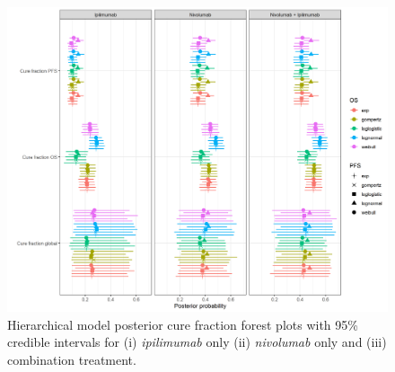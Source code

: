 \documentclass[AMA,STIX1COL]{WileyNJD-v2}
\begin{document}




\begin{figure}
\centering
\includegraphics[width=0.9\linewidth]{forest_plot_joint_cf_hier.png}
\caption{\label{fig:cf_forest_all_tx} Hierarchical model posterior cure fraction forest plots with 95\% credible intervals for (i) {\it ipilimumab} only (ii) {\it nivolumab} only and (iii) combination treatment.}
\end{figure}
\end{document}
